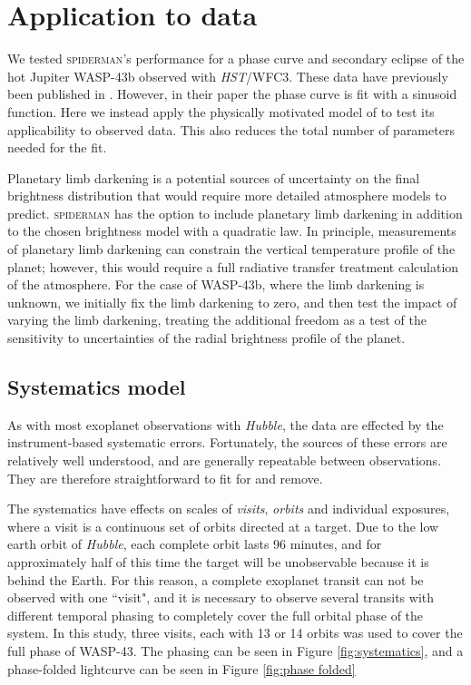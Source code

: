 \documentclass[a4paper,fleqn,usenatbib]{mnras}
\begin{document}
\section{Application to data}\label{sec:Application}

We tested \textsc{spiderman}'s performance for a phase curve and secondary eclipse of the hot Jupiter WASP-43b observed with \emph{HST}/WFC3. These data have previously been published in \citet{Stevenson2014}. However, in their paper the phase curve is fit with a sinusoid function. Here we instead apply the physically motivated model of \citet{Zhang2016} to test its applicability to observed data. This also reduces the total number of parameters needed for the fit.

Planetary limb darkening is a potential sources of uncertainty on the final brightness distribution that would require more detailed atmosphere models to predict. \textsc{spiderman} has the option to include planetary limb darkening in addition to the chosen brightness model with a quadratic law. In principle, measurements of planetary limb darkening can constrain the vertical temperature profile of the planet; however, this would require a full radiative transfer treatment calculation of the atmosphere. For the case of WASP-43b, where the limb darkening is unknown, we initially fix the limb darkening to zero, and then test the impact of varying the limb darkening, treating the additional freedom as a test of the sensitivity to uncertainties of the radial brightness profile of the planet.


\subsection{Systematics model}\label{sec:systematics}

As with most exoplanet observations with \emph{Hubble}, the data are effected by the instrument-based systematic errors. Fortunately, the sources of these errors are relatively well understood, and are generally repeatable between observations. They are therefore straightforward to fit for and remove. 

The systematics have effects on scales of \emph{visits}, \emph{orbits} and individual exposures, where a visit is a continuous set of orbits directed at a target. Due to the low earth orbit of \emph{Hubble}, each complete orbit lasts 96 minutes, and for approximately half of this time the target will be unobservable because it is behind the Earth. For this reason, a complete exoplanet transit can not be observed with one ``visit", and it is necessary to observe several transits with different temporal phasing to completely cover the full orbital phase of the system. In this study, three visits, each with 13 or 14 orbits was used to cover the full phase of WASP-43. The phasing can be seen in Figure \ref{fig:systematics}, and a phase-folded lightcurve can be seen in Figure \ref{fig:phase folded}
\end{document}
